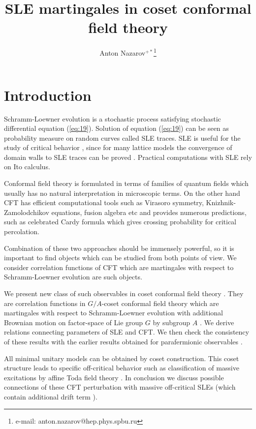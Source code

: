 \documentclass{jetpl}
\title{SLE martingales in coset conformal field theory}
\author{Anton Nazarov$^{+*}$\/\thanks{e-mail: anton.nazarov@hep.phys.spbu.ru}}
\begin{document}
\maketitle

\section{Introduction}
\label{sec:introduction}

Schramm-Loewner evolution \cite{schramm2000scaling} is a stochastic process satisfying stochastic differential equation (\ref{eq:19}). Solution of equation (\ref{eq:19}) can be seen as probability measure on random curves called SLE traces. SLE is  useful for the study of critical behavior \cite{Cardy:2005kh,rohde2005basic}, since for many lattice models  the convergence of  domain walls to SLE traces can be proved \cite{bauer20062d,schramm2006conformally}. Practical computations with SLE rely on Ito calculus. 

Conformal field theory \cite{belavin1984ics} is formulated in terms of families of quantum fields which usually has no natural interpretation in microscopic terms. On the other hand CFT has efficient computational tools such as Virasoro symmetry, Knizhnik-Zamolodchikov equations, fusion algebra etc and provides numerous predictions, such as celebrated Cardy formula \cite{cardy1992critical,smirnov2001critical} which gives crossing probability for critical percolation. 

Combination of these two approaches should be immensely powerful, so it is important to find objects which can be studied from both points of view. We consider correlation functions of CFT which are martingales with respect to Schramm-Loewner evolution are such objects.

We present new class of such observables in coset conformal field theory \cite{Goddard198588}. They are correlation functions in $G/A$-coset conformal field theory which are martingales with respect to Schramm-Loewner evolution with additional Brownian motion on factor-space of Lie group $G$ by subgroup $A$ \cite{2011arXiv1112.4354N}. We derive relations connecting parameters of SLE and CFT. We then check the consistency of these results with the earlier results obtained for parafermionic observables \cite{santachiara2008sle}. 

All minimal unitary models can be obtained by coset construction. This coset structure leads to specific off-critical behavior such as classification of massive excitations by affine Toda field theory \cite{fateev1990conformal,eguchi1989deformations,hollowood1989rational}. In conclusion we discuss possible connections of these CFT perturbation with massive off-critical SLEs (which contain additional drift term  \cite{makarov2010off}).
\end{document}
